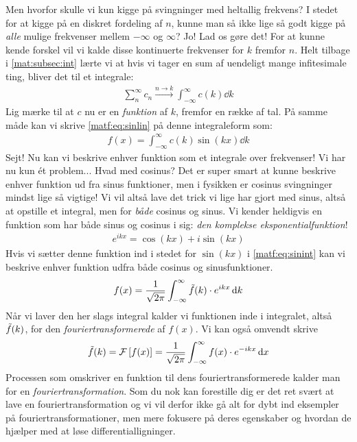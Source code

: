 \documentclass[crop=false, class=memoir]{standalone}
\begin{document}
Men hvorfor skulle vi kun kigge på svingninger med heltallig frekvens? I stedet for at kigge på en diskret fordeling af $n$, kunne man så ikke lige så godt kigge på \emph{alle} mulige frekvenser mellem $-\infty$ og $\infty$? Jo! Lad os gøre det! For at kunne kende forskel vil vi kalde disse kontinuerte frekvenser for $k$ fremfor $n$. Helt tilbage i \cref{mat:subsec:int} lærte vi at hvis vi tager en sum af uendeligt mange infitesimale ting, bliver det til et integrale:
\begin{align}
    \sum_n^{\infty} c_n\xrightarrow{n\rightarrow k} \int_{-\infty}^{\infty} c(k) \dd{k}
\end{align}
Lig mærke til at $c$ nu er en \emph{funktion} af $k$, fremfor en række af tal. På samme måde kan vi skrive \cref{matf:eq:sinlin} på denne integraleform som:
\begin{align}
    f(x) = \int_{-\infty}^{\infty} c(k) \sin{(k x)} \dd{k}
    \label{matf:eq:sinint}
\end{align}
Sejt! Nu kan vi beskrive enhver funktion som et integrale over frekvenser! Vi har nu kun ét problem... Hvad med cosinus? Det er super smart at kunne beskrive enhver funktion ud fra sinus funktioner, men i fysikken er cosinus svingninger mindst lige så vigtige! Vi vil altså lave det trick vi lige har gjort med sinus, altså at opstille et integral, men for \emph{både} cosinus og sinus. Vi kender heldigvis en funktion som har både sinus og cosinus i sig: \emph{den komplekse eksponentialfunktion}!
\begin{align}
    e^{ik x} = \cos{(k x)} + i\sin{(k x)}
\end{align}
Hvis vi sætter denne funktion ind i stedet for $\sin{(k x)}$ i \cref{matf:eq:sinint} kan vi beskrive enhver funktion udfra både cosinus og sinusfunktioner.
\begin{align}
    f(x) = \frac{1}{\sqrt{2\pi}} \int_{-\infty}^{\infty} \Tilde{f}(k) \cdot e^{ik x} \dd{k}
    \label{matf:eq:invfour}
\end{align}
Når vi laver den her slags integral kalder vi funktionen inde i integralet, altså $\Tilde{f}(k)$, for den \emph{fouriertransformerede} af $f(x)$. Vi kan også omvendt skrive
\begin{align}
    \Tilde{f}(k) = \mathcal{F}\left[f(x)\right] = \frac{1}{\sqrt{2\pi}} \int_{-\infty}^{\infty} f(x) \cdot e^{-ik x} \dd{x}
\end{align}
Processen som omskriver en funktion til dens fouriertransformerede kalder man for en \emph{fouriertransformation}. Som du nok kan forestille dig er det ret svært at lave en fouriertransformation og vi vil derfor ikke gå alt for dybt ind eksempler på fouriertransformationer, men mere fokusere på deres egenskaber og hvordan de hjælper med at løse differentialligninger. 
\end{document}
